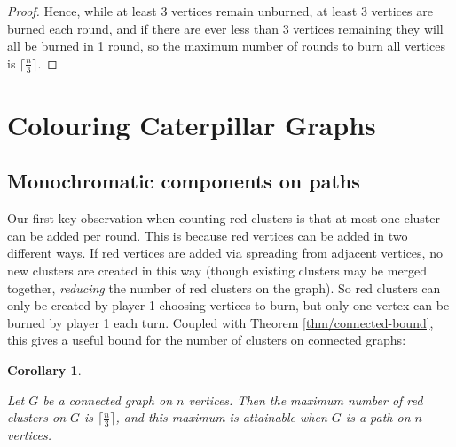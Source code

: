 \documentclass{mpaper}
\newtheorem{corollary}[theorem]{Corollary}
\begin{document}
\begin{proof}

  Hence, while at least $3$ vertices remain unburned, at least $3$ vertices are burned each round, and if there are ever less than $3$ vertices remaining they will all be burned in 1 round, so the maximum number of rounds to burn all vertices is $\lceil \frac{n}{3} \rceil$.
  
\end{proof}

\section{Colouring Caterpillar Graphs}

\subsection{Monochromatic components on paths}

Our first key observation when counting red clusters is that at most one cluster can be added per round. This is because red vertices can be added in two different ways. If red vertices are added via spreading from adjacent vertices, no new clusters are created in this way (though existing clusters may be merged together, \emph{reducing} the number of red clusters on the graph). So red clusters can only be created by player 1 choosing vertices to burn, but only one vertex can be burned by player 1 each turn. Coupled with Theorem \ref{thm/connected-bound}, this gives a useful bound for the number of clusters on connected graphs:

\begin{corollary}
  \label{cor/path-clusters}

  Let $G$ be a connected graph on $n$ vertices. Then the maximum number of red clusters on $G$ is $\lceil \frac{n}{3} \rceil$, and this maximum is attainable when $G$ is a path on $n$ vertices.

\end{corollary}
\end{document}
